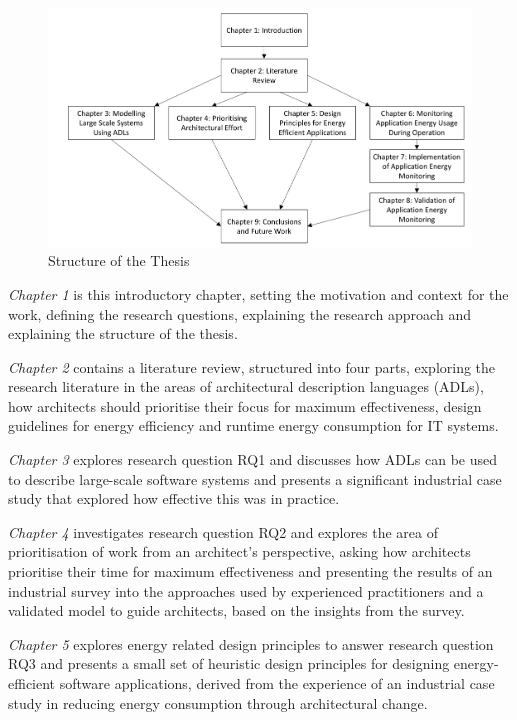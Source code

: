 \begin{figure}[h]
\centering
\includegraphics[width=1.0\textwidth]{Figures/intro-chapters}
\caption{Structure of the Thesis}
\label{figure:intro-chapters}
\end{figure}

\emph{Chapter 1} is this introductory chapter, setting the motivation and context for the work, defining the research questions, explaining the research approach and explaining the structure of the thesis.

\emph{Chapter 2} contains a literature review, structured into four parts, exploring the research literature in the areas of architectural description languages (ADLs), how architects should prioritise their focus for maximum effectiveness, design guidelines for energy efficiency and runtime energy consumption for IT systems.

\emph{Chapter 3} explores research question RQ1 and discusses how ADLs can be used to describe large-scale software systems and presents a significant industrial case study that explored how effective this was in practice.

\emph{Chapter 4} investigates research question RQ2 and explores the area of prioritisation of work from an architect's perspective, asking how architects prioritise their time for maximum effectiveness and presenting the results of an industrial survey into the approaches used by experienced practitioners and a validated model to guide architects, based on the insights from the survey.

\emph{Chapter 5} explores energy related design principles to answer research question RQ3 and presents a small set of heuristic design principles for designing energy-efficient software applications, derived from the experience of an industrial case study in reducing energy consumption through architectural change.

